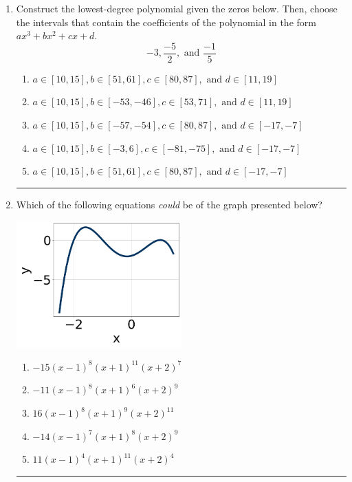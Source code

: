 \documentclass[14pt]{extbook}
\newcommand{\litem}[1]{\item#1\hspace*{-1cm}\rule{\textwidth}{0.4pt}}
\begin{document}
\begin{enumerate}
{\begin{enumerate}[label=\Alph*.]
\end{enumerate} }
\litem{
Construct the lowest-degree polynomial given the zeros below. Then, choose the intervals that contain the coefficients of the polynomial in the form $ax^3+bx^2+cx+d$.\[ -3, \frac{-5}{2}, \text{ and } \frac{-1}{5} \]\begin{enumerate}[label=\Alph*.]
\item \( a \in [10, 15], b \in [51, 61], c \in [80, 87], \text{ and } d \in [11, 19] \)
\item \( a \in [10, 15], b \in [-53, -46], c \in [53, 71], \text{ and } d \in [11, 19] \)
\item \( a \in [10, 15], b \in [-57, -54], c \in [80, 87], \text{ and } d \in [-17, -7] \)
\item \( a \in [10, 15], b \in [-3, 6], c \in [-81, -75], \text{ and } d \in [-17, -7] \)
\item \( a \in [10, 15], b \in [51, 61], c \in [80, 87], \text{ and } d \in [-17, -7] \)

\end{enumerate} }
\litem{
Which of the following equations \textit{could} be of the graph presented below?
\begin{center}
    \includegraphics[width=0.5\textwidth]{../Figures/polyGraphToFunctionCopyA.png}
\end{center}
\begin{enumerate}[label=\Alph*.]
\item \( -15(x - 1)^{8} (x + 1)^{11} (x + 2)^{7} \)
\item \( -11(x - 1)^{8} (x + 1)^{6} (x + 2)^{9} \)
\item \( 16(x - 1)^{8} (x + 1)^{9} (x + 2)^{11} \)
\item \( -14(x - 1)^{7} (x + 1)^{8} (x + 2)^{9} \)
\item \( 11(x - 1)^{4} (x + 1)^{11} (x + 2)^{4} \)


\end{enumerate}}
\end{enumerate}
\end{document}
